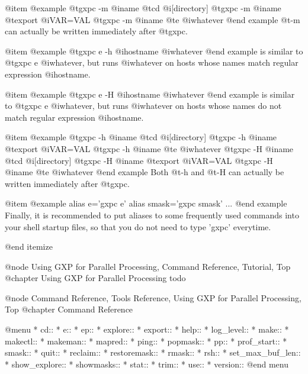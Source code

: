@item 
@example
@t{gxpc -m} @i{name} @t{cd} @i{[directory]}
@t{gxpc -m} @i{name} @t{export} @i{VAR=VAL}
@t{gxpc -m} @i{name} @t{e} @i{whatever}
@end example
@t{-m} can actually be written immediately after @t{gxpc}.

@item 
@example
@t{gxpc e} -h @i{hostname} @i{whatever}
@end example
is similar to @t{gxpc e} @i{whatever}, but runs @i{whatever} on
hosts whose names match regular expression @i{hostname}. 

@item 
@example
@t{gxpc e} -H @i{hostname} @i{whatever}
@end example
is similar to @t{gxpc e} @i{whatever}, but runs @i{whatever} on
hosts whose names do not match regular expression @i{hostname}. 

@item 
@example
@t{gxpc -h} @i{name} @t{cd} @i{[directory]}
@t{gxpc -h} @i{name} @t{export} @i{VAR=VAL}
@t{gxpc -h} @i{name} @t{e} @i{whatever}
@t{gxpc -H} @i{name} @t{cd} @i{[directory]}
@t{gxpc -H} @i{name} @t{export} @i{VAR=VAL}
@t{gxpc -H} @i{name} @t{e} @i{whatever}
@end example
Both @t{-h} and @t{-H} can actually be written immediately after @t{gxpc}.

@item
@example
alias e='gxpc e'
alias smask='gxpc smask'
...
@end example
Finally, it is recommended to put aliases to some frequently used
commands into your shell startup files, so that you do not need to
type 'gxpc' everytime.


@end itemize




@node Using GXP for Parallel Processing, Command Reference, Tutorial, Top
@chapter Using GXP for Parallel Processing
todo

@node Command Reference, Tools Reference, Using GXP for Parallel Processing, Top
@chapter Command Reference

@menu
* cd::                          
* e::                           
* ep::                          
* explore::                     
* export::                      
* help::                        
* log_level::                   
* make::                        
* makectl::                     
* makeman::                     
* mapred::                      
* ping::                        
* popmask::                     
* pp::                          
* prof_start::                  
* smask::                       
* quit::                        
* reclaim::                     
* restoremask::                 
* rmask::                       
* rsh::                         
* set_max_buf_len::             
* show_explore::                
* showmasks::                   
* stat::                        
* trim::                        
* use::                         
* version::                     
@end menu

